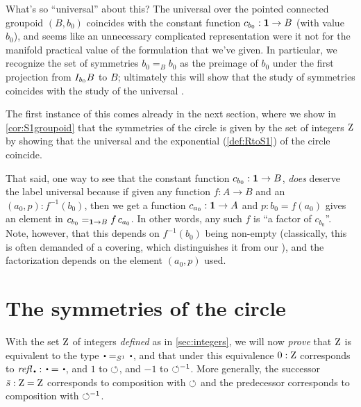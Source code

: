 \begin{remark}
  What's so ``universal'' about this?
The universal \covering over the pointed connected groupoid $(B,b_0)$ coincides with the constant function $c_{b_0}:\mathbf{1}\to B$ (with value $b_0$), and seems like an unnecessary complicated representation were it not for the manifold practical value of the formulation that we've given.  
In particular, we recognize the set of symmetries $b_0=_Bb_0$ as the preimage of $b_0$ under the first projection from ${I_{b_0}}B$ to $B$; ultimately this will show that the study of symmetries coincides with the study of the universal \covering.

The first instance of this comes already in the next section, where we show in \cref{cor:S1groupoid} that the symmetries of the circle is given by the set of integers $\mathrm{Z}$ by showing that the universal \covering and the exponential \covering (\cref{def:RtoS1}) of the circle coincide.

That said, one way to see that the constant function $c_{b_0}:\mathbf{1}\to B$, \emph{does} deserve the label universal because if given any function $f:A\to B$ and an $(a_0,p): f^{-1}(b_0)$, then we get a function $c_{a_0}:\mathbf{1}\to A$ and $p:b_0=f(a_0)$ gives an element in $c_{b_0}=_{\mathbf{1}\to B}f\, c_{a_0}$.  In other words, any such $f$ is ``a factor of $c_{b_0}$''.  
Note, however, that this depends on $f^{-1}(b_0)$ being non-empty (classically, this is often demanded of a covering, which distinguishes it from our \coverings), and the factorization depends on the element $(a_0,p)$ used. 
\end{remark}



\section{The symmetries of the circle}
\label{sec:pi1S1isZ}\label{sec:symcirc}

With the set $\mathrm{Z}$ of integers \emph{defined} as in \cref{sec:integers}, 
we will now \emph{prove} that $\mathrm{Z}$ is equivalent to the type 
$\base=_{\Sc}\base$, and that under this equivalence $0:\mathrm{Z}$ corresponds to 
$\refl{\base}:\base=\base$, and $1$ to $\circlearrowleft$, and $-1$ to $\circlearrowleft^{-1}$. 
More generally, the successor $\bar {s}:\mathrm{Z}=\mathrm{Z}$ corresponds to composition with $\circlearrowleft$
and the predecessor corresponds to composition with $\circlearrowleft^{-1}$.


